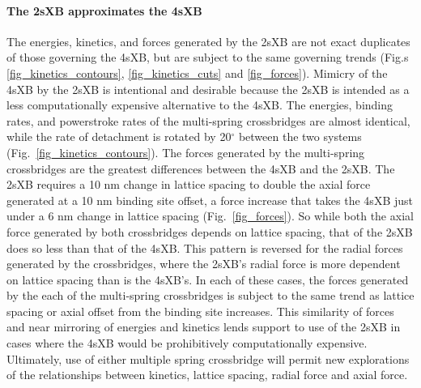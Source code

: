\documentclass[]{article}
\begin{document}
\paragraph{The 2sXB approximates the 4sXB} %
The energies, kinetics, and forces generated by the 2sXB are not exact duplicates of those governing the 4sXB, but are subject to the same governing trends (Fig.s \ref{fig_kinetics_contours}, \ref{fig_kinetics_cuts} and \ref{fig_forces}). 
Mimicry of the 4sXB by the 2sXB is intentional and desirable because the 2sXB is intended as a less computationally expensive alternative to the 4sXB. 
The energies, binding rates, and powerstroke rates of the multi-spring crossbridges are almost identical, while the rate of detachment is rotated by 20$^\circ$ between the two systems (Fig.\ \ref{fig_kinetics_contours}).
The forces generated by the multi-spring crossbridges are the greatest differences between the 4sXB and the 2sXB.
The 2sXB requires a 10 nm change in lattice spacing to double the axial force generated at a 10 nm binding site offset, a force increase that takes the 4sXB just under a 6 nm change in lattice spacing (Fig.\ \ref{fig_forces}). 
So while both the axial force generated by both crossbridges depends on lattice spacing, that of the 2sXB does so less than that of the 4sXB.
This pattern is reversed for the radial forces generated by the crossbridges, where the 2sXB's radial force is more dependent on lattice spacing than is the 4sXB's.
In each of these cases, the forces generated by the each of the multi-spring crossbridges is subject to the same trend as lattice spacing or axial offset from the binding site increases.
This similarity of forces and near mirroring of energies and kinetics lends support to use of the 2sXB in cases where the 4sXB would be prohibitively computationally expensive.
Ultimately, use of either multiple spring crossbridge will permit new explorations of the relationships between kinetics, lattice spacing, radial force and axial force.
\end{document}
